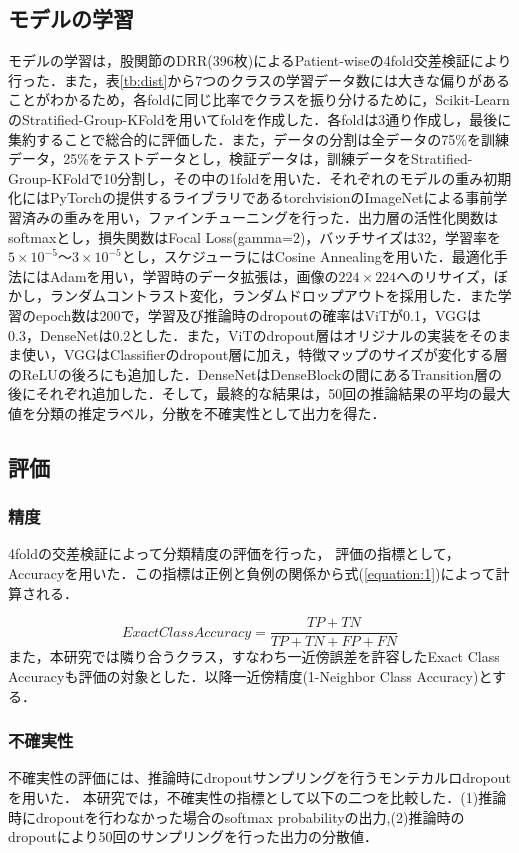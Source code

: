 \documentclass[technicalreport]{ieicej}
\begin{document}
\subsection{モデルの学習}
モデルの学習は，股関節のDRR(396枚)によるPatient-wiseの4fold交差検証により行った．また，表\ref{tb:dist}から7つのクラスの学習データ数には大きな偏りがあることがわかるため，各foldに同じ比率でクラスを振り分けるために，Scikit-LearnのStratified-Group-KFoldを用いてfoldを作成した．各foldは3通り作成し，最後に集約することで総合的に評価した．また，データの分割は全データの75\%を訓練データ，25\%をテストデータとし，検証データは，訓練データをStratified-Group-KFoldで10分割し，その中の1foldを用いた．それぞれのモデルの重み初期化にはPyTorchの提供するライブラリであるtorchvisionのImageNetによる事前学習済みの重みを用い，ファインチューニングを行った．出力層の活性化関数はsoftmaxとし，損失関数はFocal Loss(gamma=2)，バッチサイズは32，学習率を$5\times10^{-5} ～3\times10^{-5}$とし，スケジューラにはCosine Annealingを用いた．最適化手法にはAdam\cite{kingma2014adam}を用い，学習時のデータ拡張は，画像の$224×224$へのリサイズ，ぼかし，ランダムコントラスト変化，ランダムドロップアウトを採用した．また学習のepoch数は200で，学習及び推論時のdropoutの確率はViTが0.1，VGGは0.3，DenseNetは0.2とした．また，ViTのdropout層はオリジナルの実装をそのまま使い，VGGはClassifierのdropout層に加え，特徴マップのサイズが変化する層のReLUの後ろにも追加した．DenseNetはDenseBlockの間にあるTransition層の後にそれぞれ追加した．そして，最終的な結果は，50回の推論結果の平均の最大値を分類の推定ラベル，分散を不確実性として出力を得た．

\subsection{評価}
\subsubsection{精度}
4foldの交差検証によって分類精度の評価を行った，
評価の指標として，Accuracyを用いた．この指標は正例と負例の関係から式(\ref{equation:1})によって計算される．

\begin{equation}
    Exact Class Accuracy = \frac{TP + TN}{TP+TN+FP+FN}
    \label{equation:1}
\end{equation}
また，本研究では隣り合うクラス，すなわち一近傍誤差を許容したExact Class Accuracyも評価の対象とした．以降一近傍精度(1-Neighbor Class Accuracy)とする．
\subsubsection{不確実性}
不確実性の評価には、推論時にdropoutサンプリングを行うモンテカルロdropout\cite{https://doi.org/10.48550/arxiv.1506.02142}を用いた．
本研究では，不確実性の指標として以下の二つを比較した．(1)推論時にdropoutを行わなかった場合のsoftmax probabilityの出力,(2)推論時のdropoutにより50回のサンプリングを行った出力の分散値．
\end{document}
